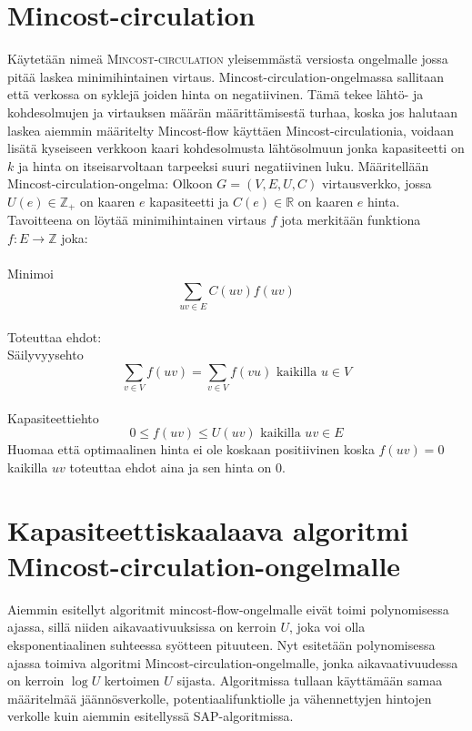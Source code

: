 \documentclass[a4paper, 11pt]{article}
\begin{document}
\section*{Mincost-circulation}
Käytetään nimeä \textsc{Mincost-circulation} yleisemmästä versiosta ongelmalle jossa pitää
laskea minimihintainen virtaus. Mincost-circulation-ongelmassa sallitaan että
verkossa on syklejä joiden hinta on negatiivinen. Tämä tekee lähtö- ja kohdesolmujen
ja virtauksen määrän määrittämisestä turhaa, koska jos halutaan laskea aiemmin määritelty
Mincost-flow käyttäen Mincost-circulationia, voidaan lisätä kyseiseen verkkoon kaari 
kohdesolmusta lähtösolmuun jonka kapasiteetti on $k$ ja hinta on itseisarvoltaan
tarpeeksi suuri negatiivinen luku. Määritellään Mincost-circulation-ongelma: 
Olkoon $G = (V, E, U, C)$ virtausverkko, jossa $U(e) \in \mathbb{Z_+}$ on 
kaaren $e$ kapasiteetti ja $C(e) \in \mathbb{R}$ on kaaren $e$ hinta. Tavoitteena on löytää minimihintainen virtaus
$f$ jota merkitään funktiona
$f : E \rightarrow \mathbb{Z}$ joka: \\\\ Minimoi $$\sum_{uv \in E} C(uv) f(uv)$$\\
Toteuttaa ehdot:\\ Säilyvyysehto
$$\sum_{v \in V} f(uv) = \sum_{v \in V} f(vu) \text{ kaikilla } u \in V$$
\\Kapasiteettiehto
$$0 \le f(uv) \le U(uv) \text{ kaikilla } uv \in E$$
Huomaa että optimaalinen hinta ei ole koskaan positiivinen koska $f(uv) = 0$ kaikilla
$uv$ toteuttaa ehdot aina ja sen hinta on $0$.
\section*{Kapasiteettiskaalaava algoritmi Mincost-circulation-ongelmalle}
Aiemmin esitellyt algoritmit mincost-flow-ongelmalle eivät toimi polynomisessa ajassa,
sillä niiden aikavaativuuksissa on kerroin $U$, joka voi olla eksponentiaalinen suhteessa
syötteen pituuteen. Nyt esitetään polynomisessa ajassa toimiva
algoritmi Mincost-circulation-ongelmalle, jonka aikavaativuudessa on 
kerroin $\log U$ kertoimen $U$ sijasta. Algoritmissa
tullaan käyttämään samaa määritelmää jäännösverkolle, potentiaalifunktiolle ja vähennettyjen
hintojen verkolle kuin aiemmin esitellyssä SAP-algoritmissa.
\end{document}
